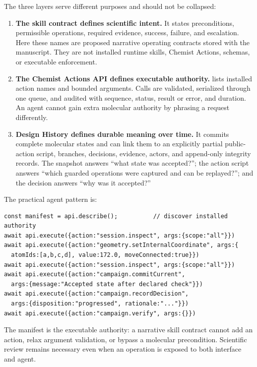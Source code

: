 The three layers serve different purposes and should not be collapsed:

\begin{enumerate}
\item \textbf{The skill contract defines scientific intent.} It states preconditions, permissible operations, required evidence, success, failure, and escalation. Here these names are proposed narrative operating contracts stored with the manuscript. They are not installed runtime skills, Chemist Actions, schemas, or executable enforcement.
\item \textbf{The Chemist Actions API defines executable authority.}  lists installed action names and bounded arguments. Calls are validated, serialized through one queue, and audited with sequence, status, result or error, and duration. An agent cannot gain extra molecular authority by phrasing a request differently.
\item \textbf{Design History defines durable meaning over time.} It commits complete molecular states and can link them to an explicitly partial public-action script, branches, decisions, evidence, actors, and append-only integrity records. The snapshot answers ``what state was accepted?''; the action script answers ``which guarded operations were captured and can be replayed?''; and the decision answers ``why was it accepted?''
\end{enumerate}

The practical agent pattern is:

\begin{lstlisting}
const manifest = api.describe();          // discover installed authority
await api.execute({action:"session.inspect", args:{scope:"all"}})
await api.execute({action:"geometry.setInternalCoordinate", args:{
  atomIds:[a,b,c,d], value:172.0, moveConnected:true}})
await api.execute({action:"session.inspect", args:{scope:"all"}})
await api.execute({action:"campaign.commitCurrent",
  args:{message:"Accepted state after declared check"}})
await api.execute({action:"campaign.recordDecision",
  args:{disposition:"progressed", rationale:"..."}})
await api.execute({action:"campaign.verify", args:{}})
\end{lstlisting}

The manifest is the executable authority: a narrative skill contract cannot add an action, relax argument validation, or bypass a molecular precondition. Scientific review remains necessary even when an operation is exposed to both interface and agent.

